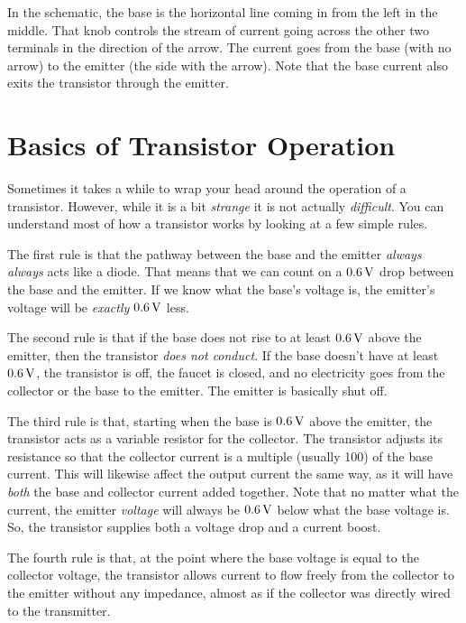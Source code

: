 In the schematic, the base is the horizontal line coming in from the left in the middle.
That knob controls the stream of current going across the other two terminals in the direction of the arrow.
The current goes from the base (with no arrow) to the emitter (the side with the arrow).
Note that the base current also exits the transistor through the emitter.

\section{Basics of Transistor Operation}

Sometimes it takes a while to wrap your head around the operation of a transistor.
However, while it is a bit \emph{strange} it is not actually \emph{difficult}.
You can understand most of how a transistor works by looking at a few simple rules.

The first rule is that the pathway between the base and the emitter \emph{always} \emph{always} acts like a diode.
That means that we can count on a $0.6\,\si{\volt}$ drop between the base and the emitter.
If we know what the base's voltage is, the emitter's voltage will be \emph{exactly} $0.6\,\si{\volt}$ less.

The second rule is that if the base does not rise to at least $0.6\,\si{\volt}$ above the emitter, then the transistor \emph{does not conduct}.  If the base doesn't have at least $0.6\,\si{\volt}$, the transistor is off, the faucet is closed, and no electricity goes from the collector or the base to the emitter.
The emitter is basically shut off.

The third rule is that, starting when the base is $0.6\,\si{\volt}$ above the emitter, the transistor acts as a variable resistor for the collector.
The transistor adjusts its resistance so that the collector current is a multiple (usually 100) of the base current.
This will likewise affect the output current the same way, as it will have \emph{both} the base and collector current added together.
Note that no matter what the current, the emitter \emph{voltage} will always be $0.6\,\si{\volt}$ below what the base voltage is.
So, the transistor supplies both a voltage drop and a current boost.

The fourth rule is that, at the point where the base voltage is equal to the collector voltage, the transistor allows current to flow freely from the collector to the emitter without any impedance, almost as if the collector was directly wired to the transmitter.
